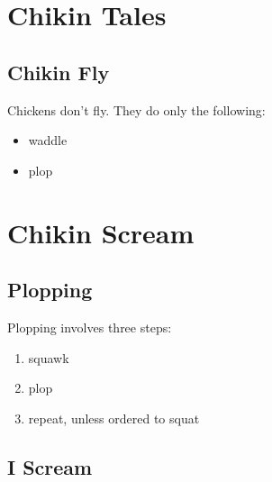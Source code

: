 \documentclass[a4paper]{article}
\begin{document}
\section{Chikin Tales}

\subsection{Chikin Fly}

Chickens don't fly. They do only the following:

\begin{itemize}
\item waddle
\item plop
\end{itemize}

\section{Chikin Scream}

\subsection{Plopping}

Plopping involves three steps:

\begin{enumerate}
\item squawk
\item plop
\item repeat, unless ordered to squat
\end{enumerate}

\subsection{I Scream}
\end{document}
